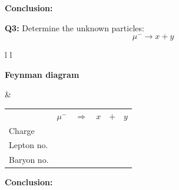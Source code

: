 \documentclass[12pt]{article}
\begin{document}
\textbf{Conclusion:}

\vspace{2.2cm}


\textbf{Q3:} Determine the unknown particles:
\[
\mu^- \rightarrow x + y
\]

\vspace{0.5cm}

\begin{tabular}{l l}

\begin{minipage}[t]{0.46\textwidth}
\vspace{0pt}
\textbf{Feynman diagram}

\vspace{0.6cm}

\begin{tikzpicture}
\begin{feynman}
  \vertex (l1) at (0,0) {\(\mu^-\)};
  \vertex [coordinate] (a) at (1,2) {};
  \vertex (l2) at (0,4) {\(x\)};
  \vertex (b) at (4,2) {};

  \diagram*{
    (l1) -- [fermion] (a) -- [fermion] (l2),
    (a) -- [boson, edge label=\(y\), momentum'={}] (b),
  };
\end{feynman}
\end{tikzpicture}
\end{minipage}
&
\begin{minipage}[t]{0.50\textwidth}
\vspace{0pt}

\renewcommand{\arraystretch}{1.4}
\begin{tabular}{@{}l c c c c c@{}}
 & \(\mu^-\) & \(\Rightarrow\) & \(x\) & \(+\) & \(y\) \\
Charge &  &  &  &  &  \\
Lepton no. &  &  &  &  &  \\
Baryon no. &  &  &  &  &  \\
\end{tabular}

\end{minipage}

\end{tabular}

\vspace{0.5cm}

\textbf{Conclusion:}
\end{document}
